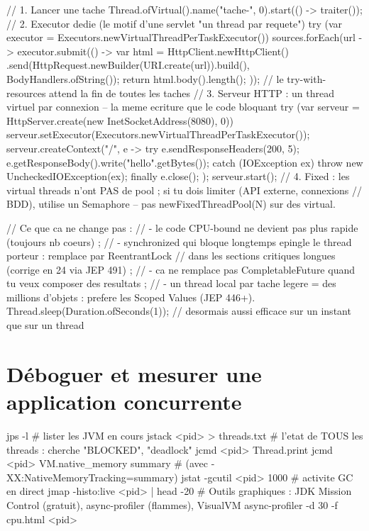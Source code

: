 \documentclass[12pt,a4paper,twoside,openright]{book}
\begin{document}
\begin{codejava}
// 1. Lancer une tache
Thread.ofVirtual().name("tache-", 0).start(() -> traiter());
// 2. Executor dedie (le motif d'une servlet "un thread par requete")
try (var executor = Executors.newVirtualThreadPerTaskExecutor()) {
    sources.forEach(url -> executor.submit(() -> { var html = HttpClient.newHttpClient()
            .send(HttpRequest.newBuilder(URI.create(url)).build(), BodyHandlers.ofString());
        return html.body().length(); }));
}    // le try-with-resources attend la fin de toutes les taches
// 3. Serveur HTTP : un thread virtuel par connexion -- la meme ecriture que le code bloquant
try (var serveur = HttpServer.create(new InetSocketAddress(8080), 0)) {
    serveur.setExecutor(Executors.newVirtualThreadPerTaskExecutor());
    serveur.createContext("/", e -> {
        try { e.sendResponseHeaders(200, 5); e.getResponseBody().write("hello".getBytes()); }
        catch (IOException ex) { throw new UncheckedIOException(ex); }
        finally { e.close(); }
    });
    serveur.start();
}
// 4. Fixed : les virtual threads n'ont PAS de pool ; si tu dois limiter (API externe, connexions
//    BDD), utilise un Semaphore -- pas newFixedThreadPool(N) sur des virtual.

// Ce que ca ne change pas :
//  - le code CPU-bound ne devient pas plus rapide (toujours nb coeurs) ;
//  - synchronized qui bloque longtemps epingle le thread porteur : remplace par ReentrantLock
//    dans les sections critiques longues (corrige en 24 via JEP 491) ;
//  - ca ne remplace pas CompletableFuture quand tu veux composer des resultats ;
//  - un thread local par tache legere = des millions d'objets : prefere les Scoped Values (JEP 446+).
Thread.sleep(Duration.ofSeconds(1));           // desormais aussi efficace sur un instant que sur un thread
\end{codejava}

\section{D\'eboguer et mesurer une application concurrente}

\begin{terminal}
jps -l                                  # lister les JVM en cours
jstack <pid> > threads.txt              # l'etat de TOUS les threads : cherche "BLOCKED", "deadlock"
jcmd <pid> Thread.print
jcmd <pid> VM.native_memory summary      # (avec -XX:NativeMemoryTracking=summary)
jstat -gcutil <pid> 1000                 # activite GC en direct
jmap -histo:live <pid> | head -20
# Outils graphiques : JDK Mission Control (gratuit), async-profiler (flammes), VisualVM
async-profiler -d 30 -f cpu.html <pid>
\end{terminal}
\end{document}
